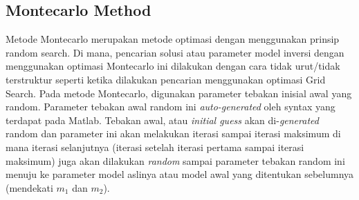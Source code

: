 \documentclass{article}
\begin{document}
\subsection{Montecarlo Method}

Metode Montecarlo merupakan metode optimasi dengan menggunakan prinsip random search.
Di mana, pencarian solusi atau parameter model inversi dengan menggunakan optimasi Montecarlo ini dilakukan dengan cara tidak urut/tidak terstruktur seperti ketika dilakukan pencarian menggunakan optimasi Grid Search.
Pada metode Montecarlo, digunakan parameter tebakan inisial awal yang random.
Parameter tebakan awal random ini \textit{auto-generated} oleh syntax yang terdapat pada Matlab.
Tebakan awal, atau \textit{initial guess} akan di-\textit{generated} random dan parameter ini akan melakukan iterasi sampai iterasi maksimum di mana iterasi selanjutnya (iterasi setelah iterasi pertama sampai iterasi maksimum) juga akan dilakukan \textit{random} sampai parameter tebakan random ini menuju ke parameter model aslinya atau model awal yang ditentukan sebelumnya (mendekati $m_1$ dan $m_2$).
\end{document}
